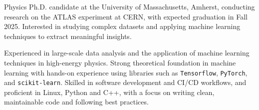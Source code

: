

\begin{cvparagraph}

 Physics Ph.D. candidate at the University of Massachusetts, Amherst, conducting research on the ATLAS experiment at CERN, with expected graduation in Fall 2025\@. Interested in studying complex datasets and applying machine learning techniques to extract meaningful insights.
 
 Experienced in large-scale data analysis and the application of machine learning techniques in high-energy physics. Strong theoretical foundation in machine learning with hands-on experience using libraries such as \texttt{Tensorflow}, \texttt{PyTorch}, and \texttt{scikit-learn}. Skilled in software development and CI/CD workflows, and proficient in Linux, Python and C++, with a focus on writing clean, maintainable code and following best practices.
\end{cvparagraph}